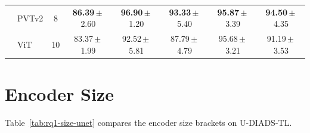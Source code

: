 \begin{table}[htbp]
\begin{tabular*}{\textwidth}{@{\extracolsep{\fill}}llcccccc@{}}
                       & PVTv2              & 8 & \textbf{86.39}\,\(\pm\)\,2.60 & \textbf{96.90}\,\(\pm\)\,1.20 & \textbf{93.33}\,\(\pm\)\,5.40 & \textbf{95.87}\,\(\pm\)\,3.39 & \textbf{94.50}\,\(\pm\)\,4.35 \\
                       & ViT                & 10 & 83.37\,\(\pm\)\,1.99 & 92.52\,\(\pm\)\,5.81 & 87.79\,\(\pm\)\,4.79 & 95.68\,\(\pm\)\,3.21 & 91.19\,\(\pm\)\,3.53 \\
        \bottomrule
    \end{tabular*}
\end{table}

\FloatBarrier
\section{Encoder Size}
\label{app:rq1-size}

Table~\ref{tab:rq1-size-unet} compares the encoder size brackets on U-DIADS-TL.

